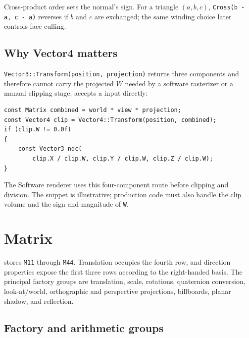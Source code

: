 Cross-product order sets the normal's sign. For a triangle $(a,b,c)$,
\texttt{Cross(b - a, c - a)} reverses if $b$ and $c$ are exchanged; the same winding choice
later controls face culling.

\subsection{Why Vector4 matters}

\texttt{Vector3::Transform(position, projection)} returns three components and therefore cannot
carry the projected $W$ needed by a software rasterizer or a manual clipping stage.
 accepts a  input directly:

\begin{lstlisting}
const Matrix combined = world * view * projection;
const Vector4 clip = Vector4::Transform(position, combined);
if (clip.W != 0.0f)
{
    const Vector3 ndc(
        clip.X / clip.W, clip.Y / clip.W, clip.Z / clip.W);
}
\end{lstlisting}

The Software renderer uses this four-component route before clipping and division. The snippet is
illustrative; production code must also handle the clip volume and the sign and magnitude of
\texttt{W}.

\section{Matrix}

 stores \texttt{M11} through \texttt{M44}. Translation occupies the fourth
row, and direction properties expose the first three rows according to the right-handed basis.
The principal factory groups are translation, scale, rotations, quaternion conversion,
look-at/world, orthographic and perspective projections, billboards, planar shadow, and
reflection.

\subsection{Factory and arithmetic groups}
\label{sec:matrix-full-reference}
\label{sec:matrix-arithmetic}

